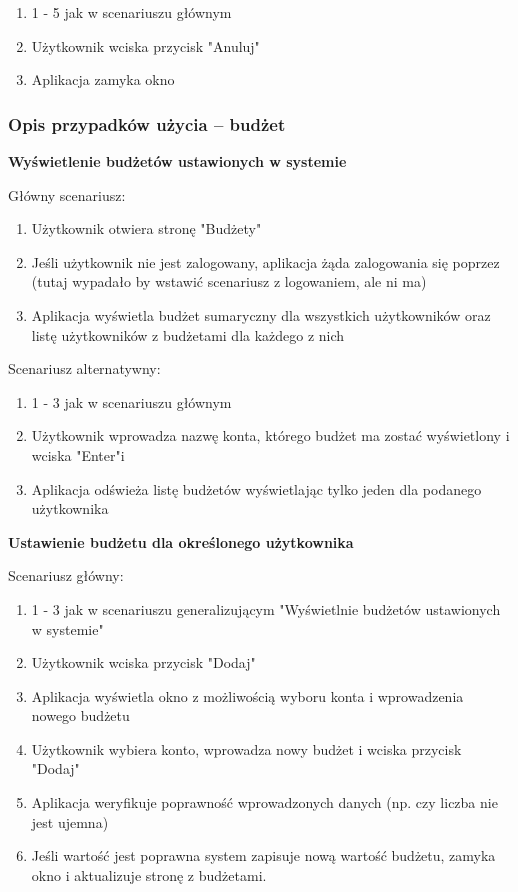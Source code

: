 \begin{enumerate}
  \item 1 - 5 jak w scenariuszu głównym
  \item Użytkownik wciska przycisk "Anuluj"
  \item Aplikacja zamyka okno
\end{enumerate}

\subsubsection{Opis przypadków użycia -- budżet}

\textbf{Wyświetlenie budżetów ustawionych w systemie}

Główny scenariusz:
\begin{enumerate}
  \item Użytkownik otwiera stronę "Budżety"
  \item Jeśli użytkownik nie jest zalogowany, aplikacja żąda zalogowania się poprzez (tutaj wypadało by wstawić scenariusz z logowaniem, ale ni ma)
  \item Aplikacja wyświetla budżet sumaryczny dla wszystkich użytkowników oraz listę użytkowników z budżetami dla każdego z nich
\end{enumerate}

Scenariusz alternatywny:

\begin{enumerate}
  \item 1 - 3 jak w scenariuszu głównym
  \item Użytkownik wprowadza nazwę konta, którego budżet ma zostać wyświetlony i wciska "Enter"i
  \item Aplikacja odświeża listę budżetów wyświetlając tylko jeden dla podanego użytkownika
\end{enumerate}

\textbf{Ustawienie budżetu dla określonego użytkownika}

Scenariusz główny:
\begin{enumerate}
  \item 1 - 3 jak w scenariuszu generalizującym "Wyświetlnie budżetów ustawionych w systemie"
  \item Użytkownik wciska przycisk "Dodaj"
  \item Aplikacja wyświetla okno z możliwością wyboru konta i wprowadzenia nowego budżetu
  \item Użytkownik wybiera konto, wprowadza nowy budżet i wciska przycisk "Dodaj"
  \item Aplikacja weryfikuje poprawność wprowadzonych danych (np. czy liczba nie jest ujemna)
  \item Jeśli wartość jest poprawna system zapisuje nową wartość budżetu, zamyka okno i aktualizuje stronę z budżetami.
\end{enumerate}

